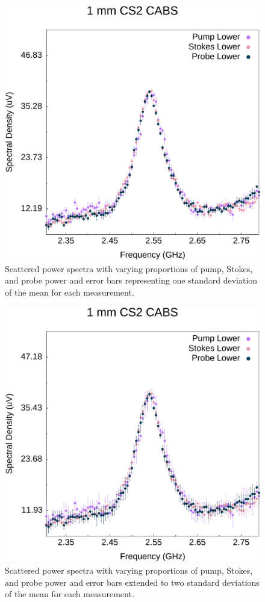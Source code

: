 \begin{figure}[ht]
  \centering
  \includegraphics[width=\textwidth]{figs/3-CoBS/PSPr-Contribute-Equally.pdf}
  \caption{Scattered power spectra with varying proportions of pump, Stokes, and probe power and error bars representing one standard deviation of the mean for each measurement.}
  \label{fig:PSPr-Contribute-Equally}
\end{figure}

\begin{figure}[ht]
  \centering
  \includegraphics[width=\textwidth]{figs/3-CoBS/PSPr-Contribute-Equally-2sigma.pdf}
  \caption{Scattered power spectra with varying proportions of pump, Stokes, and probe power and error bars extended to two standard deviations of the mean for each measurement.}
  \label{fig:PSPr-Contribute-Equally-2sigma}
\end{figure}


